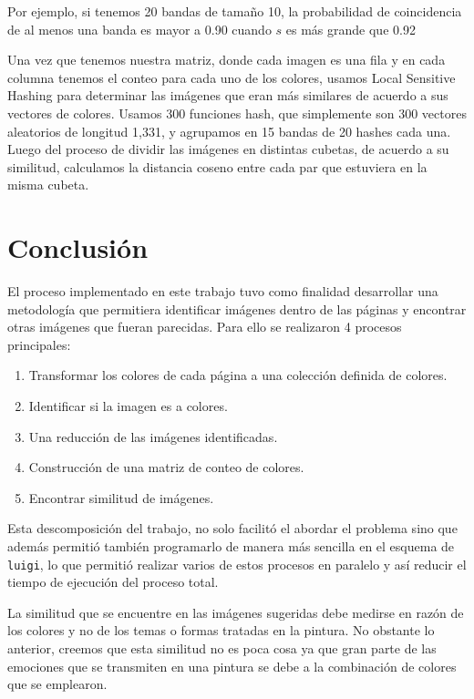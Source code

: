 Por ejemplo, si tenemos 20 bandas de tamaño 10, la probabilidad de coincidencia de al menos una banda es mayor a 0.90 cuando $s$ es más grande que 0.92

Una vez que tenemos nuestra matriz, donde cada imagen es una fila y en cada columna tenemos el conteo para cada uno de los colores, usamos Local Sensitive Hashing para determinar las imágenes que eran más similares de acuerdo a sus vectores de colores. Usamos 300 funciones hash, que simplemente son 300 vectores aleatorios de longitud 1,331, y agrupamos en 15 bandas de 20 hashes cada una. Luego del proceso de dividir las imágenes en distintas cubetas, de acuerdo a su similitud, calculamos la distancia coseno entre cada par que estuviera en la misma cubeta.


\section{Conclusión}

El proceso implementado en este trabajo tuvo como finalidad desarrollar una metodología que permitiera identificar imágenes dentro de las páginas y encontrar otras imágenes que fueran parecidas. Para ello se realizaron  4 procesos principales: 

\begin{enumerate}
\item Transformar los colores de cada página a una colección definida de colores.
\item Identificar si la imagen es a colores.
\item Una reducción de las imágenes identificadas. 
\item Construcción de una matriz de conteo de colores.
\item Encontrar similitud de imágenes.
\end{enumerate}

Esta descomposición del trabajo, no solo facilitó el abordar el problema sino que además permitió también programarlo de manera más sencilla en el esquema de \texttt{luigi}, lo que permitió realizar varios de estos procesos en paralelo y así reducir el tiempo de ejecución del proceso total.

La similitud que se encuentre en las imágenes sugeridas debe medirse en razón de los colores y no de los temas o formas tratadas en la pintura. No obstante lo anterior, creemos que esta similitud no es poca cosa ya que gran parte de las emociones que se transmiten en una pintura se debe a la combinación de colores que se emplearon.


